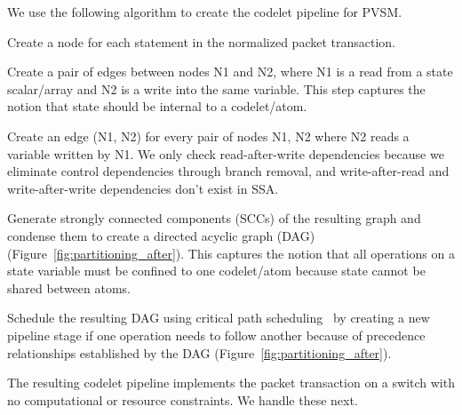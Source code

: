 We use the following algorithm to create the codelet pipeline for PVSM.
\begin{CompactEnumerate}
  \item Create a node for each statement in the normalized packet transaction.
  \item Create a pair of edges between nodes N1 and N2, where N1 is a read from
    a state scalar/array and N2 is a write into the same variable.  This step
    captures the notion that state should be internal to a codelet/atom.
  \item Create an edge (N1, N2) for every pair of nodes N1, N2 where N2 reads a
    variable written by N1. We only check read-after-write dependencies because
    we eliminate control dependencies through branch removal, and
    write-after-read and write-after-write dependencies don't exist in SSA.
  \item Generate strongly connected components (SCCs) of the resulting graph
    and condense them to create a directed acyclic graph (DAG)
    (Figure~\ref{fig:partitioning_after}). This captures the notion that all
    operations on a state variable must be confined to one codelet/atom because
    state cannot be shared between atoms.
  \item Schedule the resulting DAG using critical path
    scheduling~\cite{crit_path_sched} by creating a new pipeline stage
    if one operation needs to follow another because of precedence
    relationships established by the DAG
    (Figure~\ref{fig:partitioning_after}).
\end{CompactEnumerate}


The resulting codelet pipeline implements the packet transaction on a
switch with no computational or resource constraints. We handle these
next.



